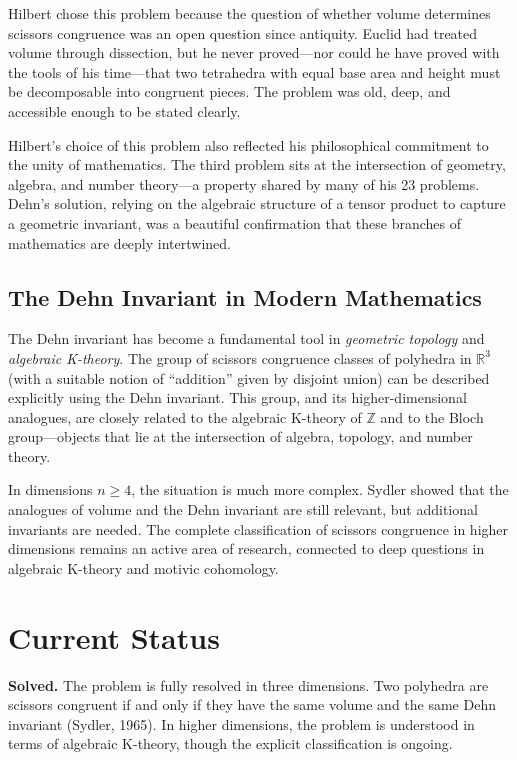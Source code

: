 Hilbert chose this problem because the question of whether volume determines scissors congruence was an open question since antiquity. Euclid had treated volume through dissection, but he never proved---nor could he have proved with the tools of his time---that two tetrahedra with equal base area and height must be decomposable into congruent pieces. The problem was old, deep, and accessible enough to be stated clearly.

Hilbert's choice of this problem also reflected his philosophical commitment to the unity of mathematics. The third problem sits at the intersection of geometry, algebra, and number theory---a property shared by many of his 23 problems. Dehn's solution, relying on the algebraic structure of a tensor product to capture a geometric invariant, was a beautiful confirmation that these branches of mathematics are deeply intertwined.

\subsection{The Dehn Invariant in Modern Mathematics}

The Dehn invariant has become a fundamental tool in \emph{geometric topology} and \emph{algebraic K-theory}. The group of scissors congruence classes of polyhedra in $\mathbb{R}^3$ (with a suitable notion of ``addition'' given by disjoint union) can be described explicitly using the Dehn invariant. This group, and its higher-dimensional analogues, are closely related to the algebraic K-theory of $\mathbb{Z}$ and to the Bloch group---objects that lie at the intersection of algebra, topology, and number theory.

In dimensions $n \geq 4$, the situation is much more complex. Sydler showed that the analogues of volume and the Dehn invariant are still relevant, but additional invariants are needed. The complete classification of scissors congruence in higher dimensions remains an active area of research, connected to deep questions in algebraic K-theory and motivic cohomology.

\section{Current Status}

\begin{solvedbox}
\textbf{Solved.} The problem is fully resolved in three dimensions. Two polyhedra are scissors congruent if and only if they have the same volume and the same Dehn invariant (Sydler, 1965). In higher dimensions, the problem is understood in terms of algebraic K-theory, though the explicit classification is ongoing.
\end{solvedbox}

